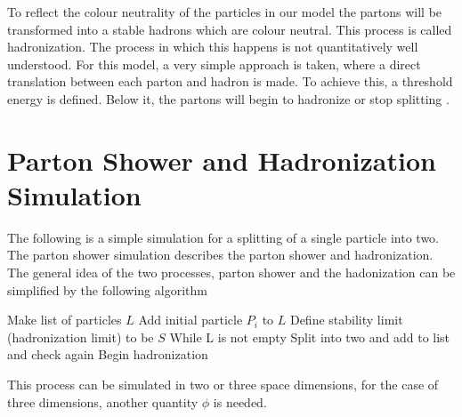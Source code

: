 To reflect the colour neutrality of the particles in our model the partons will be transformed into a stable hadrons which are colour neutral. This process is called hadronization. The process in which this happens is not quantitatively well understood. For this model, a very simple approach is taken, where a direct translation between each parton and hadron is made. To achieve  this, a threshold energy is defined. Below it, the partons will begin to hadronize or stop splitting \citep{Salam:2010zt}. 


\section{Parton Shower and Hadronization Simulation}

The following is a simple simulation for a splitting of a single particle into two. The parton shower simulation describes the parton shower and hadronization. The general idea of the two processes, parton shower and the hadonization can be simplified by the following algorithm
\begin{algorithmic}\label{logrithm}
\State Make list of particles $L$ 
\State Add initial particle $P_{i}$ to $L$
\State Define stability limit (hadronization limit) to be $S$  
\State While L is not empty
	\State Split into two and add to list and check again 
\Else 
	\State Begin hadronization  
\EndIf
\end{algorithmic}
This process can be simulated in two or three space dimensions, for the case of three dimensions, another quantity $\phi$ is needed.   

